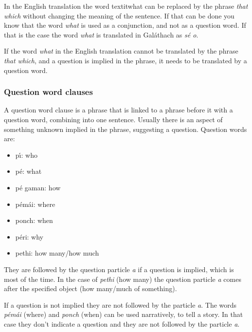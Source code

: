 In the English translation the word textit{what} can be replaced by the phrase \textit{that which} without changing the meaning of the sentence. If that can be done you know that the word \textit{what} is used as a conjunction, and not as a question word. If that is the case the word \textit{what} is translated in Gal\'{a}thach as \textit{s\'{e} o}.

If the word \textit{what} in the English translation cannot be translated by the phrase \textit{that which}, and a question is implied in the phrase, it needs to be translated by a question word.

\subsubsection{Question word clauses}

A question word clause is a phrase that is linked to a phrase before it with a question word, combining into one sentence. Usually there is an aspect of something unknown implied in the phrase, suggesting a question. Question words are:

\begin{itemize}
  \item p\'{\i}: who
  \item p\'{e}: what
  \item p\'{e} gaman: how
  \item p\'{e}m\'{a}i: where
  \item ponch: when
  \item p\'{e}ri: why
  \item pethi: how many/how much
\end{itemize}

They are followed by the question particle \textit{a} if a question is implied, which is most of the time. In the case of \textit{pethi} (how many) the question particle \textit{a} comes after the specified object (how many/much of something).

If a question is not implied they are not followed by the particle \textit{a}. The words \textit{p\'{e}m\'{a}i} (where) and \textit{ponch} (when) can be used narratively, to tell a story. In that case they don't indicate a question and they are not followed by the particle \textit{a}.

